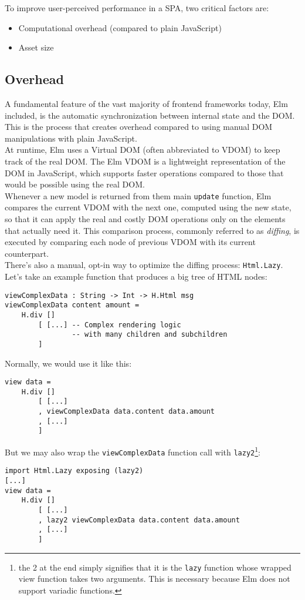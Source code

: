 To improve user-perceived performance in a SPA, two critical factors are:
\begin{itemize}
    \item Computational overhead (compared to plain JavaScript)
    \item Asset size
\end{itemize}

\subsection{Overhead}
A fundamental feature of the vast majority of frontend frameworks today, Elm included, is the automatic synchronization between internal state and the DOM. This is the process that creates overhead compared to using manual DOM manipulations with plain JavaScript.\\

At runtime, Elm uses a Virtual DOM (often abbreviated to VDOM) to keep track of the real DOM. The Elm VDOM is a lightweight representation of the DOM in JavaScript, which supports faster operations compared to those that would be possible using the real DOM. \cite{noauthor_htmllazy_nodate}\\

Whenever a new model is returned from them main \texttt{update} function, Elm compares the current VDOM with the next one, computed using the new state, so that it can apply the real and costly DOM operations only on the elements that actually need it. This comparison process, commonly referred to as \textit{diffing}, is executed by comparing each node of previous VDOM with its current counterpart.\\

There's also a manual, opt-in way to optimize the diffing process: \texttt{Html.Lazy}. Let's take an example function that produces a big tree of HTML nodes:
\begin{verbatim}
viewComplexData : String -> Int -> H.Html msg
viewComplexData content amount =
    H.div []
        [ [...] -- Complex rendering logic 
                -- with many children and subchildren
        ]
\end{verbatim}

Normally, we would use it like this:
\begin{verbatim}
view data =
    H.div []
        [ [...]
        , viewComplexData data.content data.amount
        , [...]
        ]
\end{verbatim}

But we may also wrap the \texttt{viewComplexData} function call with \texttt{lazy2}\footnote[1]{the 2 at the end simply signifies that it is the \texttt{lazy} function whose wrapped view function takes two arguments. This is necessary because Elm does not support variadic functions.}:
\begin{verbatim}
import Html.Lazy exposing (lazy2)
[...]
view data =
    H.div []
        [ [...]
        , lazy2 viewComplexData data.content data.amount
        , [...]
        ]
\end{verbatim}


